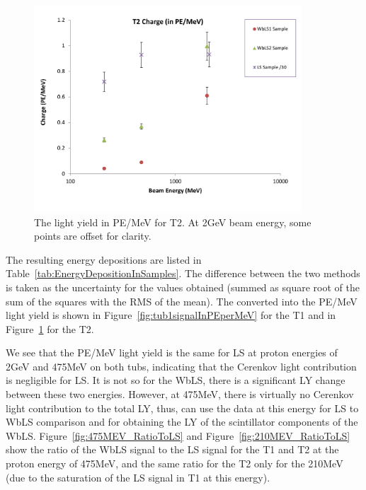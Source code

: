 \documentclass[preprint,12pt]{elsarticle}
\begin{document}
\begin{figure}[ht]
	\centering
		\includegraphics[width=100mm]{tub2signalInPEperMEV.pdf}
	\caption{The light yield in PE/MeV for T2. At 2GeV beam energy, some points are offset for clarity.}
	\label{fig:tub2signalInPEperMeV}
\end{figure}

The resulting energy depositions are listed in Table~\ref{tab:EnergyDepositionInSamples}. The difference between the two methods is taken as the uncertainty for the values obtained (summed as square root of the sum of the squares with the RMS of the mean). The converted into the PE/MeV light yield is shown in Figure~\ref{fig:tub1signalInPEperMeV} for the T1 and in Figure~\ref{fig:tub2signalInPEperMeV} for the T2.

We see that the PE/MeV light yield is the same for LS at proton energies of 2GeV and 475MeV on both tubs, indicating that the Cerenkov light contribution is negligible for LS. It is not so for the WbLS, there is a significant LY change between these two energies. However, at 475MeV, there is virtually no Cerenkov light contribution to the total LY, thus, can use the data at this energy for LS to WbLS comparison and for obtaining the LY of the scintillator components of the WbLS. Figure~\ref{fig:475MEV_RatioToLS} and Figure~\ref{fig:210MEV_RatioToLS} show the ratio of the WbLS signal to the LS signal for the T1 and T2 at the proton energy of 475MeV, and the same ratio for the T2 only for the 210MeV (due to the saturation of the LS signal in T1 at this energy).
\end{document}
